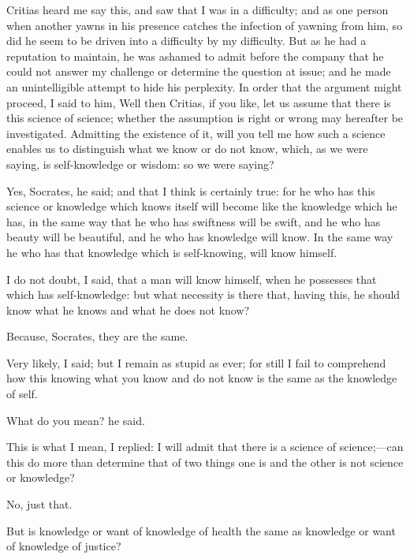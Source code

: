 \documentclass[11pt,letter]{article}
\begin{document}
\par  Critias heard me say this, and saw that I was in a difficulty; and as one person when another yawns in his presence catches the infection of yawning from him, so did he seem to be driven into a difficulty by my difficulty. But as he had a reputation to maintain, he was ashamed to admit before the company that he could not answer my challenge or determine the question at issue; and he made an unintelligible attempt to hide his perplexity. In order that the argument might proceed, I said to him, Well then Critias, if you like, let us assume that there is this science of science; whether the assumption is right or wrong may hereafter be investigated. Admitting the existence of it, will you tell me how such a science enables us to distinguish what we know or do not know, which, as we were saying, is self-knowledge or wisdom: so we were saying?

\par  Yes, Socrates, he said; and that I think is certainly true: for he who has this science or knowledge which knows itself will become like the knowledge which he has, in the same way that he who has swiftness will be swift, and he who has beauty will be beautiful, and he who has knowledge will know. In the same way he who has that knowledge which is self-knowing, will know himself.

\par  I do not doubt, I said, that a man will know himself, when he possesses that which has self-knowledge: but what necessity is there that, having this, he should know what he knows and what he does not know?

\par  Because, Socrates, they are the same.

\par  Very likely, I said; but I remain as stupid as ever; for still I fail to comprehend how this knowing what you know and do not know is the same as the knowledge of self.

\par  What do you mean? he said.

\par  This is what I mean, I replied: I will admit that there is a science of science;—can this do more than determine that of two things one is and the other is not science or knowledge?

\par  No, just that.

\par  But is knowledge or want of knowledge of health the same as knowledge or want of knowledge of justice?
\end{document}
